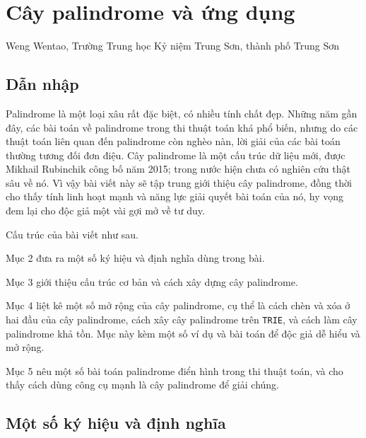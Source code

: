 \documentclass[11pt]{article}
\begin{document}
\section{Cây palindrome và ứng dụng}

\begin{center}
Weng Wentao, Trường Trung học Kỷ niệm Trung Sơn, thành phố Trung Sơn
\end{center}

\renewcommand{\abstractname}{Tóm tắt}
\begin{abstract}
Bài viết giới thiệu cây palindrome, một cấu trúc dữ liệu khá mới để xử lý
các xâu con palindrome. Trước hết bài viết trình bày cấu trúc và cách xây
dựng cơ bản của cây palindrome, sau đó đưa ra một số mở rộng trên cây
palindrome, và cuối cùng dùng một số bài tập để minh họa năng lực giải quyết
bài toán của cây palindrome.
\end{abstract}

\subsection{Dẫn nhập}

Palindrome là một loại xâu rất đặc biệt, có nhiều tính chất đẹp. Những năm
gần đây, các bài toán về palindrome trong thi thuật toán khá phổ biến, nhưng
do các thuật toán liên quan đến palindrome còn nghèo nàn, lời giải của các bài
toán thường tương đối đơn điệu. Cây palindrome là một cấu trúc dữ liệu mới,
được Mikhail Rubinchik công bố năm 2015; trong nước hiện chưa có nghiên cứu
thật sâu về nó. Vì vậy bài viết này sẽ tập trung giới thiệu cây palindrome,
đồng thời cho thấy tính linh hoạt mạnh và năng lực giải quyết bài toán của
nó, hy vọng đem lại cho độc giả một vài gợi mở về tư duy.

Cấu trúc của bài viết như sau.

Mục 2 đưa ra một số ký hiệu và định nghĩa dùng trong bài.

Mục 3 giới thiệu cấu trúc cơ bản và cách xây dựng cây palindrome.

Mục 4 liệt kê một số mở rộng của cây palindrome, cụ thể là cách chèn và xóa ở
hai đầu của cây palindrome, cách xây cây palindrome trên \texttt{TRIE}, và
cách làm cây palindrome khả tồn. Mục này kèm một số ví dụ và bài toán để độc
giả dễ hiểu và mở rộng.

Mục 5 nêu một số bài toán palindrome điển hình trong thi thuật toán, và cho
thấy cách dùng công cụ mạnh là cây palindrome để giải chúng.

\subsection{Một số ký hiệu và định nghĩa}
\end{document}
